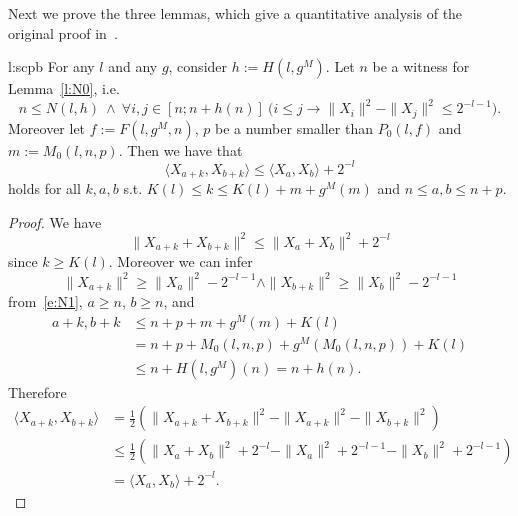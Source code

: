 Next we prove the three lemmas, which give a quantitative analysis of the original proof in~\cite{Wittmann90}.\\

\begin{lemma*}{l:scpb}
For any $l$ and any $g$, consider $h:= H(l,g^M)$. Let
$n$ be a witness for Lemma~\ref{l:N0}, i.e. 
\[
n\leq N(l,h)\ \wedge\ \forall i,j\in[n;n+h(n)]\ 
\big( i\leq j\rightarrow \|X_i\|^2-\|X_j\|^2\leq 2^{-l-1} \big) . \tag{N}\label{e:N1}
\]
Moreover let $f:=F(l,g^M,n)$,
$p$ be a number smaller than $P_0(l,f)$
and  $m:=M_0(l,n,p)$. Then we have that
\[ 
\langle X_{a+k},X_{b+k} \rangle \leq \langle X_{a},X_{b} \rangle + 2^{-l}
\]
holds for all $k,a,b$ s.t. $K(l)\leq k \leq K(l)+m+g^M(m)$ and $ n\leq a,b \leq n+p$.
\end{lemma*}
\begin{proof}
We have
\[
\|X_{a+k}+X_{b+k}\|^2 \leq \|X_{a}+X_{b}\|^2 + 2^{-l} \tag{1}\label{e:sc1}
\] since $k\geq K(l)$. Moreover we can infer
\[
\|X_{a+k}\|^2 \geq \|X_{a}\|^2 - 2^{-l-1} \wedge \|X_{b+k}\|^2 \geq \|X_{b}\|^2 - 2^{-l-1} \tag{2}\label{e:sc2}
\] from~\eqref{e:N1}, $a\geq n$, $b \geq n$, and 
\begin{align*}
 a+k,b+k &\leq n+p+m+g^M(m)+K(l) \\
 &= n+p+M_0(l,n,p)+g^M(M_0(l,n,p))+K(l) \\
 &\leq n+H(l,g^M)(n) = n+h(n). 
\end{align*}
Therefore
\begin{align*}
\langle X_{a+k},X_{b+k} \rangle &= \frac{1}{2}( \|X_{a+k}+X_{b+k}\|^2 - \|X_{a+k}\|^2 - \|X_{b+k}\|^2 )\\
&\leq \frac{1}{2}( \|X_{a}+X_{b}\|^2 + 2^{-l} - \|X_{a}\|^2 + 2^{-l-1} - \|X_{b}\|^2  + 2^{-l-1})\\
&= \langle X_{a},X_{b} \rangle + 2^{-l}.
\end{align*}
\end{proof}

